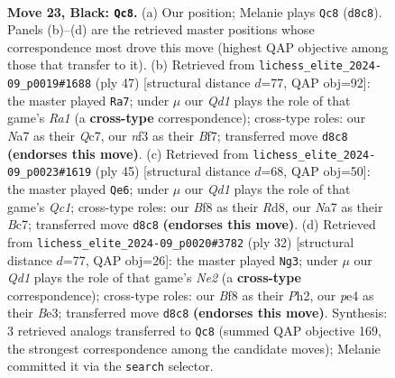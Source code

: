 \documentclass[11pt]{article}
\begin{document}
\clearpage

\begin{figure}[p]\centering
\begin{subfigure}{0.46\textwidth}\centering
\resizebox{\linewidth}{!}{%
\newchessgame
\chessboard[
  setfen={1r1q1b2/n1p1r2k/p2p1pp1/3Pp2p/RP2P3/3PRN1P/3B1PP1/1Q3K2 b - - 0 23},
  showmover=false,
  pgfstyle=straightmove, color=movearrow, markmove={d8-c8}
]}
\caption{}
\end{subfigure}\hfill
\begin{subfigure}{0.46\textwidth}\centering
\resizebox{\linewidth}{!}{%
\newchessgame
\chessboard[
  setfen={rr5k/2q2bpp/p1np1p2/4pP2/RPPpP3/3P2N1/2B3PP/1RQ3K1 b - - 5 24},
  showmover=false,
  pgfstyle=straightmove, color=movearrow, markmove={a8-a7}
]}
\caption{}
\end{subfigure}
\\[4pt]
\begin{subfigure}{0.46\textwidth}\centering
\resizebox{\linewidth}{!}{%
\newchessgame
\chessboard[
  setfen={2qrr1k1/ppb2p2/2p4p/2Pp1ppn/1P1P4/2N1P2P/PBQ2PP1/4RRK1 b - - 1 23},
  showmover=false,
  pgfstyle=straightmove, color=movearrow, markmove={c8-e6}
]}
\caption{}
\end{subfigure}\hfill
\begin{subfigure}{0.46\textwidth}\centering
\resizebox{\linewidth}{!}{%
\newchessgame
\chessboard[
  setfen={5rk1/2qnbppp/r1ppp3/8/p3PP2/1P2BQ2/P1P1N1PP/3R1R1K w - - 0 17},
  showmover=false,
  pgfstyle=straightmove, color=movearrow, markmove={e2-g3}
]}
\caption{}
\end{subfigure}
\caption{\textbf{Move 23, Black: \texttt{Qc8}.} (a) Our position; Melanie plays \texttt{Qc8} (\texttt{d8c8}). Panels (b)--(d) are the retrieved master positions whose correspondence most drove this move (highest QAP objective among those that transfer to it). (b) Retrieved from \texttt{lichess\_elite\_2024-09\_p0019\#1688} (ply 47) [structural distance $d$=77, QAP obj=92]: the master played \texttt{Ra7}; under $\mu$ our \emph{Qd1} plays the role of that game's \emph{Ra1} (a \textbf{cross-type} correspondence); cross-type roles: our \emph{N}a7 as their \emph{Q}c7, our \emph{n}f3 as their \emph{B}f7; transferred move \texttt{d8c8} \textbf{(endorses this move)}. (c) Retrieved from \texttt{lichess\_elite\_2024-09\_p0023\#1619} (ply 45) [structural distance $d$=68, QAP obj=50]: the master played \texttt{Qe6}; under $\mu$ our \emph{Qd1} plays the role of that game's \emph{Qc1}; cross-type roles: our \emph{B}f8 as their \emph{R}d8, our \emph{N}a7 as their \emph{B}c7; transferred move \texttt{d8c8} \textbf{(endorses this move)}. (d) Retrieved from \texttt{lichess\_elite\_2024-09\_p0020\#3782} (ply 32) [structural distance $d$=77, QAP obj=26]: the master played \texttt{Ng3}; under $\mu$ our \emph{Qd1} plays the role of that game's \emph{Ne2} (a \textbf{cross-type} correspondence); cross-type roles: our \emph{B}f8 as their \emph{P}h2, our \emph{p}e4 as their \emph{B}e3; transferred move \texttt{d8c8} \textbf{(endorses this move)}. Synthesis: 3 retrieved analogs transferred to \texttt{Qc8} (summed QAP objective 169, the strongest correspondence among the candidate moves); Melanie committed it via the \texttt{search} selector.}
\label{fig:thought-m45}
\end{figure}
\end{document}

